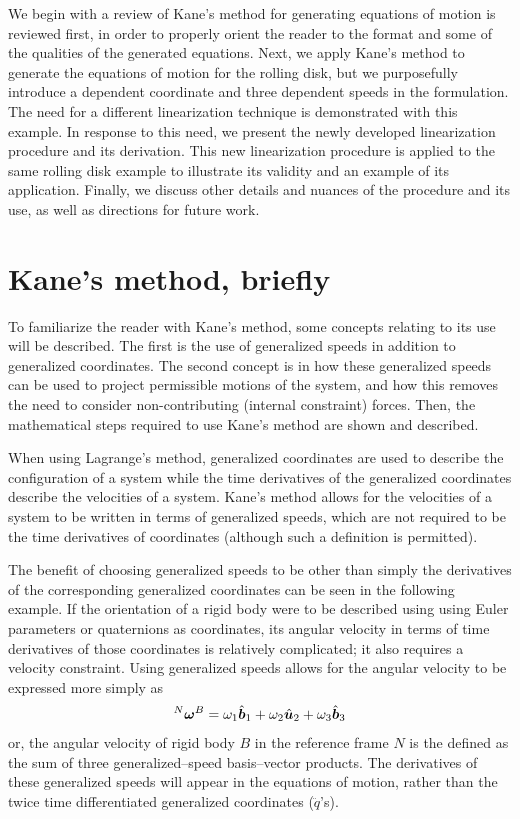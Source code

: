 We begin with a review of Kane's method for generating equations of motion is
reviewed first, in order to properly orient the reader to the format and some
of the qualities of the generated equations. Next, we apply Kane's method to
generate the equations of motion for the rolling disk, but we purposefully
introduce a dependent coordinate and three dependent speeds in the formulation.
The need for a different linearization technique is demonstrated with this
example. In response to this need, we present the newly developed linearization
procedure and its derivation. This new linearization procedure is applied to the
same rolling disk example to illustrate its validity and an example of its
application. Finally, we discuss other details and nuances of the procedure and
its use, as well as directions for future work.

\section{Kane's method, briefly}
\label{sec:kane_method}
To familiarize the reader with Kane's method, some concepts relating to its use
will be described.  The first is the use of generalized speeds in addition to
generalized coordinates.  The second concept is in how these generalized speeds
can be used to project permissible motions of the system, and how this removes
the need to consider non-contributing (internal constraint) forces.  Then, the
mathematical steps required to use Kane's method are shown and described.

When using Lagrange's method, generalized coordinates are used to describe the
configuration of a system while the time derivatives of the generalized
coordinates describe the velocities of a system.  Kane's method allows for the
velocities of a system to be written in terms of generalized speeds, which are
not required to be the time derivatives of coordinates (although such a
definition is permitted).

The benefit of choosing generalized speeds to be other than simply the
derivatives of the corresponding generalized coordinates can be seen in the
following example. If the orientation of a rigid body were to be described
using using Euler parameters or quaternions as coordinates, its angular
velocity in terms of time derivatives of those coordinates is relatively
complicated; it also requires a velocity constraint. Using generalized speeds
allows for the angular velocity to be expressed more simply as
\begin{align}
\label{eq:ex1}
{^N}\boldsymbol{\omega}^B = \omega_1 \hat{\boldsymbol{b}}_{1} + \omega_2 \hat{\boldsymbol{u}}_{2} + \omega_3 \hat{\boldsymbol{b}}_{3}
\end{align}
or, the angular velocity of rigid body $B$ in the reference frame $N$ is the
defined as the sum of three generalized--speed basis--vector products.
The derivatives of these generalized speeds will appear in the equations
of motion, rather than the twice time differentiated generalized coordinates
($\ddot{{q}}$'s).

